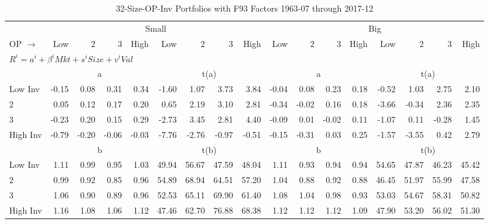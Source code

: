 
\begin{table}[!ht]
\footnotesize
\centering
\caption{32-Size-OP-Inv Portfolios with F93 Factors 1963-07 through 2017-12}
\begin{tabular}{lrrrrrrrrrrrrrrrr}
  \toprule
    & \multicolumn{8}{c}{Small} & \multicolumn{8}{c}{Big} \\
      \cmidrule(r){2-9} \cmidrule(r){10-17}
    OP $\rightarrow$ & Low & 2 & 3 & High & Low & 2 & 3 & High & Low & 2 & 3 & High & Low & 2 & 3 & High \\ 
  \midrule
  \multicolumn{17}{l}{$R^i=a^i+\beta^iMkt+s^iSize+v^iVal$} \\

  
    
      & \multicolumn{4}{c}{a} & \multicolumn{4}{c}{t(a)}
    
      & \multicolumn{4}{c}{a} & \multicolumn{4}{c}{t(a)}
    
    \\
      \cmidrule(r){2-5} \cmidrule(r){6-9} \cmidrule(r){10-13} \cmidrule(r){14-17}

    Low Inv   & -0.15  & 0.08  & 0.31  & 0.34  & -1.60  & 1.07  & 3.73  & 3.84  & -0.04  & 0.08  & 0.23  & 0.18  & -0.52  & 1.03  & 2.75  & 2.10  \\
           2  & 0.05  & 0.12  & 0.17  & 0.20  & 0.65  & 2.19  & 3.10  & 2.81  & -0.34  & -0.02  & 0.16  & 0.18  & -3.66  & -0.34  & 2.36  & 2.35  \\
           3  & -0.23  & 0.20  & 0.15  & 0.29  & -2.73  & 3.45  & 2.81  & 4.40  & -0.09  & 0.01  & -0.02  & 0.11  & -1.07  & 0.11  & -0.28  & 1.45  \\
    High Inv  & -0.79  & -0.20  & -0.06  & -0.03  & -7.76  & -2.76  & -0.97  & -0.51  & -0.15  & -0.31  & 0.03  & 0.25  & -1.57  & -3.55  & 0.42  & 2.79  \\

  
    
      & \multicolumn{4}{c}{b} & \multicolumn{4}{c}{t(b)}
    
      & \multicolumn{4}{c}{b} & \multicolumn{4}{c}{t(b)}
    
    \\
      \cmidrule(r){2-5} \cmidrule(r){6-9} \cmidrule(r){10-13} \cmidrule(r){14-17}

    Low Inv   & 1.11  & 0.99  & 0.95  & 1.03  & 49.94  & 56.67  & 47.59  & 48.04  & 1.11  & 0.93  & 0.94  & 0.94  & 54.65  & 47.87  & 46.23  & 45.42  \\
           2  & 0.99  & 0.92  & 0.85  & 0.96  & 54.89  & 68.94  & 64.51  & 57.20  & 1.04  & 0.88  & 0.92  & 0.88  & 46.45  & 51.97  & 55.99  & 47.58  \\
           3  & 1.06  & 0.90  & 0.89  & 0.96  & 52.53  & 65.11  & 69.90  & 61.40  & 1.08  & 1.04  & 0.98  & 0.93  & 53.03  & 54.67  & 58.31  & 50.82  \\
    High Inv  & 1.16  & 1.08  & 1.06  & 1.12  & 47.46  & 62.70  & 76.88  & 68.38  & 1.12  & 1.12  & 1.12  & 1.09  & 47.90  & 53.20  & 56.02  & 51.30  \\


\end{tabular}
\end{table}
